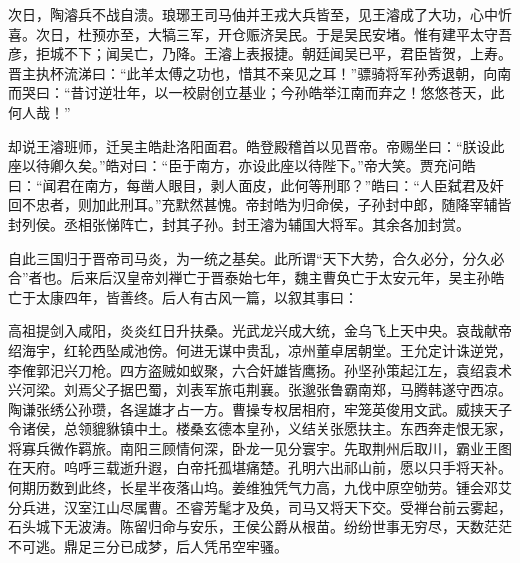 次日，陶濬兵不战自溃。琅琊王司马伷并王戎大兵皆至，见王濬成了大功，心中忻喜。次日，杜预亦至，大犒三军，开仓赈济吴民。于是吴民安堵。惟有建平太守吾彦，拒城不下；闻吴亡，乃降。王濬上表报捷。朝廷闻吴已平，君臣皆贺，上寿。晋主执杯流涕曰：“此羊太傅之功也，惜其不亲见之耳！”骠骑将军孙秀退朝，向南而哭曰：“昔讨逆壮年，以一校尉创立基业；今孙皓举江南而弃之！悠悠苍天，此何人哉！”

却说王濬班师，迁吴主皓赴洛阳面君。皓登殿稽首以见晋帝。帝赐坐曰：“朕设此座以待卿久矣。”皓对曰：“臣于南方，亦设此座以待陛下。”帝大笑。贾充问皓曰：“闻君在南方，每凿人眼目，剥人面皮，此何等刑耶？”皓曰：“人臣弑君及奸回不忠者，则加此刑耳。”充默然甚愧。帝封皓为归命侯，子孙封中郎，随降宰辅皆封列侯。丞相张悌阵亡，封其子孙。封王濬为辅国大将军。其余各加封赏。

自此三国归于晋帝司马炎，为一统之基矣。此所谓“天下大势，合久必分，分久必合”者也。后来后汉皇帝刘禅亡于晋泰始七年，魏主曹奂亡于太安元年，吴主孙皓亡于太康四年，皆善终。后人有古风一篇，以叙其事曰：

高祖提剑入咸阳，炎炎红日升扶桑。光武龙兴成大统，金乌飞上天中央。哀哉献帝绍海宇，红轮西坠咸池傍。何进无谋中贵乱，凉州董卓居朝堂。王允定计诛逆党，李傕郭汜兴刀枪。四方盗贼如蚁聚，六合奸雄皆鹰扬。孙坚孙策起江左，袁绍袁术兴河梁。刘焉父子据巴蜀，刘表军旅屯荆襄。张邈张鲁霸南郑，马腾韩遂守西凉。陶谦张绣公孙瓒，各逞雄才占一方。曹操专权居相府，牢笼英俊用文武。威挟天子令诸侯，总领貔貅镇中土。楼桑玄德本皇孙，义结关张愿扶主。东西奔走恨无家，将寡兵微作羁旅。南阳三顾情何深，卧龙一见分寰宇。先取荆州后取川，霸业王图在天府。呜呼三载逝升遐，白帝托孤堪痛楚。孔明六出祁山前，愿以只手将天补。何期历数到此终，长星半夜落山坞。姜维独凭气力高，九伐中原空劬劳。锺会邓艾分兵进，汉室江山尽属曹。丕睿芳髦才及奂，司马又将天下交。受禅台前云雾起，石头城下无波涛。陈留归命与安乐，王侯公爵从根苗。纷纷世事无穷尽，天数茫茫不可逃。鼎足三分已成梦，后人凭吊空牢骚。